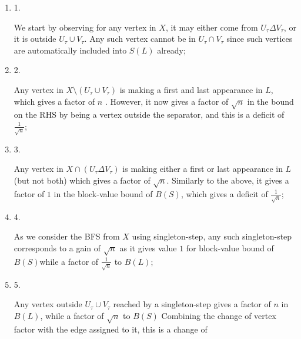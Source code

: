 \begin{enumerate}


\item[] 
1. 


We start by observing for any vertex in $X$, it may either come from $U_{\tau}\Delta V_{\tau}$, or it is outside $U_{\tau}\cup V_{\tau}$. Any such vertex cannot be in $U_{\tau}\cap V_{\tau}$ since such vertices are automatically included into $S(L)$ already;\par





\item[] 
2. 


Any vertex in $X\setminus(U_{\tau}\cup V_{\tau})$ is making a first and last appearance in $L$, which gives a factor of $n$ . However, it now gives a factor of $\sqrt{n}$ in the bound on the RHS by being a vertex outside the separator, and this is a deficit of $\frac{1}{\sqrt{n}}$;\par





\item[] 
3. 


Any vertex in $X\cap(U_{\tau}\Delta V_{\tau})$ is making either a first or last appearance in $L$ (but not both) which gives a factor of $\sqrt{n}$. Similarly to the above, it gives a factor of $1$ in the block-value bound of $B(S)$, which gives a deficit of $\frac{1}{\sqrt{n}}$;\par





\item[] 
4. 


As we consider the BFS from $X$ using singleton-step, any such singleton-step corresponds to a gain of $\sqrt{n}$ as it gives value $1$ for block-value bound of $B(S)$while a factor of $\frac{1}{\sqrt{n}}$ to $B(L)$;\par





\item[] 
5. 


Any vertex outside $U_{\tau}\cup V_{\tau}$ reached by a singleton-step gives a factor of $n$ in $B(L)$, while a factor of $\sqrt{n}$ to $B(S)$ Combining the change of vertex factor with the edge assigned to it, this is a change of\par



\end{enumerate}
